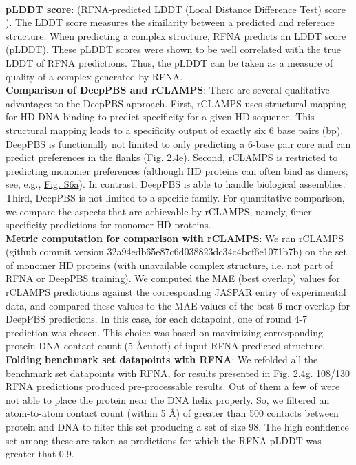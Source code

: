 \\
\textbf{pLDDT score}: (RFNA-predicted LDDT (Local Distance Difference Test) score \citep{Mariani2013}). The LDDT score measures the similarity between a predicted and reference structure. When predicting a complex structure, RFNA predicts an LDDT score (pLDDT). These pLDDT scores were shown \citep{baek2024na} to be well correlated with the true LDDT of RFNA predictions. Thus, the pLDDT can be taken as a measure of quality of a complex generated by RFNA.
\\
\textbf{Comparison of DeepPBS and rCLAMPS}: There are several qualitative advantages to the DeepPBS approach. First, rCLAMPS uses structural mapping for HD-DNA binding to predict specificity for a given HD sequence. This structural mapping leads to a specificity output of exactly six 6 base pairs (bp). DeepPBS is functionally not limited to only predicting a 6-base pair core and can predict preferences in the flanks (\hyperref[fig:pdna3]{Fig. 2.4e}). Second, rCLAMPS is restricted to predicting monomer preferences (although HD proteins can often bind as dimers; see, e.g., \hyperref[fig:pdnaS6]{Fig. S6a}). In contrast, DeepPBS is able to handle biological assemblies. Third, DeepPBS is not limited to a specific family. For quantitative comparison, we compare the aspects that are achievable by rCLAMPS, namely, 6mer specificity predictions for monomer HD proteins.
\\
\textbf{Metric computation for comparison with rCLAMPS}: We ran rCLAMPS (github commit version 32a94edb65e87c6d038823dc34c4bcf6e1071b7b) on the set of monomer HD proteins (with unavailable complex structure, i.e. not part of RFNA or DeepPBS training). We computed the MAE (best overlap) values for rCLAMPS predictions against the corresponding JASPAR entry of experimental data, and compared these values to the MAE values of the best 6-mer overlap for DeepPBS predictions. In this case, for each datapoint, one of round 4-7 prediction was chosen. This choice was based on maximizing corresponding protein-DNA contact count (5 \AA cutoff) of input RFNA predicted structure. 
\\
\textbf{Folding benchmark set datapoints with RFNA}: We refolded all the benchmark set datapoints with RFNA, for results presented in \hyperref[fig:pdna3]{Fig. 2.4g}. 108/130 RFNA predictions produced pre-processable results. Out of them a few of were not able to place the protein near the DNA helix properly. So, we filtered an atom-to-atom contact count (within 5 \AA) of greater than 500 contacts between protein and DNA to filter this set producing a set of size 98. The high confidence set among these are taken as predictions for which the RFNA pLDDT was greater that 0.9.

